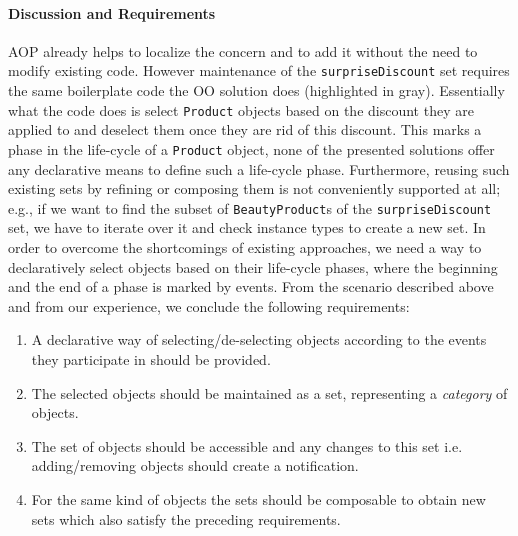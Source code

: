 \paragraph{Discussion and Requirements}

AOP already helps to localize the concern and to add it without the need to modify existing code.
However maintenance of the \texttt{surpriseDiscount} set requires the same boilerplate code the OO solution does (highlighted in gray).
Essentially what the code does is select \texttt{Product} objects based on the discount they are applied to and deselect them once they are rid of this discount. 
This marks a phase in the life-cycle of a \texttt{Product} object, none of the presented solutions offer any declarative means to define such a life-cycle phase.
Furthermore, reusing such existing sets by refining or composing them is not conveniently supported at all; e.g., if we want to find the subset of \lstinline{BeautyProduct}s of the \lstinline{surpriseDiscount} set, we have to iterate over it and check instance types to create a new set.
In order to overcome the shortcomings of existing approaches, we need a way to declaratively select objects based on their life-cycle phases, where the beginning and the end of a phase is marked by events. From the scenario described above and from our experience, we conclude the following requirements:

\begin{enumerate}[{Requirement}1{:}]
\item A declarative way of selecting/de-selecting objects according to the events they participate in should be provided.
\item The selected objects should be maintained as a set, representing a \emph{category} of objects.
\item The set of objects should be accessible and any changes to this set i.e. adding/removing objects should create a notification.
\item For the same kind of objects the sets should be composable to obtain new sets which also satisfy the preceding requirements.
\end{enumerate}


